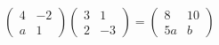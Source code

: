 $\begin{pmatrix} 4 & -2 \\ a & 1 \end{pmatrix}\begin{pmatrix} 3 & 1 \\ 2 & -3 \end{pmatrix}=\begin{pmatrix} 8 & 10 \\ 5a & b \end{pmatrix}$
